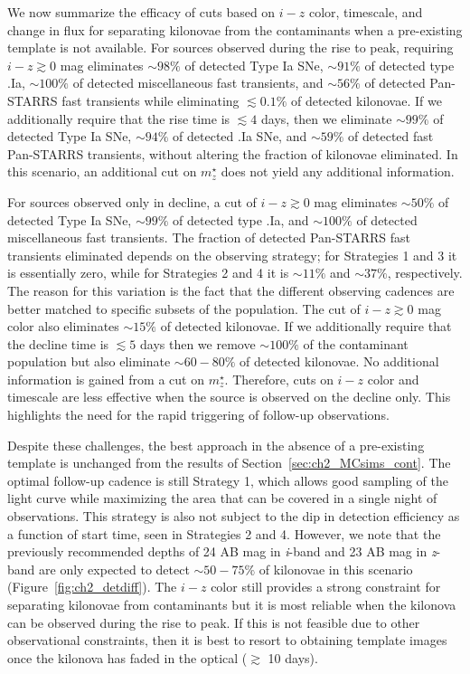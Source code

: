 We now summarize the efficacy of cuts based on $i-z$ color, timescale, and change in flux for separating kilonovae from the contaminants when a pre-existing template is not available. For sources observed during the rise to peak, requiring $i-z\gtrsim0$ mag eliminates $\sim98\%$ of detected Type Ia SNe, $\sim91\%$ of detected type .Ia, $\sim100\%$ of detected miscellaneous fast transients, and $\sim 56\%$ of detected Pan-STARRS fast transients while eliminating $\lesssim0.1\%$ of detected kilonovae. If we additionally require that the rise time is $\lesssim4$ days, then we eliminate $\sim99\%$ of detected Type Ia SNe, $\sim94\%$ of detected .Ia SNe, and $\sim59\%$ of detected fast Pan-STARRS transients, without altering the fraction of kilonovae eliminated. In this scenario, an additional cut on $m^{\star}_z$ does not yield any additional information.

For sources observed only in decline, a cut of $i-z\gtrsim0$ mag eliminates $\sim50\%$ of detected Type Ia SNe, $\sim99\%$ of detected type .Ia, and $\sim 100\%$ of detected miscellaneous fast transients. The fraction of detected Pan-STARRS fast transients eliminated depends on the observing strategy; for Strategies 1 and 3 it is essentially zero, while for Strategies 2 and 4 it is $\sim11\%$ and $\sim37\%$, respectively. The reason for this variation is the fact that the different observing cadences are better matched to specific subsets of the population. The cut of $i-z\gtrsim0$ mag color also eliminates $\sim 15\%$ of detected kilonovae. If we additionally require that the decline time is $\lesssim 5$ days then we remove $\sim100\%$ of the contaminant population but also eliminate $\sim60-80\%$ of detected kilonovae. No additional information is gained from a cut on $m^{\star}_z$. Therefore, cuts on $i-z$ color and timescale are less effective when the source is observed on the decline only. This highlights the need for the rapid triggering of follow-up observations.

Despite these challenges, the best approach in the absence of a pre-existing template is unchanged from the results of Section~\ref{sec:ch2_MCsims_cont}. The optimal follow-up cadence is still Strategy 1, which allows good sampling of the light curve while maximizing the area that can be covered in a single night of observations. This strategy is also not subject to the dip in detection efficiency as a function of start time, seen in Strategies 2 and 4. However, we note that the previously recommended depths of 24 AB mag in {\em i}-band and 23 AB mag in {\em z}-band are only expected to detect $\sim50-75\%$ of kilonovae in this scenario (Figure~\ref{fig:ch2_detdiff}). The $i-z$ color still provides a strong constraint for separating kilonovae from contaminants but it is most reliable when the kilonova can be observed during the rise to peak. If this is not feasible due to other observational constraints, then it is best to resort to obtaining template images once the kilonova has faded in the optical ($\gtrsim$ 10 days).

